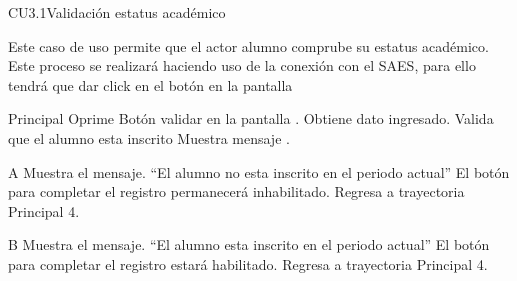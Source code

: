 \begin{UseCase}{CU3.1}{Validación estatus académico}{
		\noindent Este caso de uso permite que el actor alumno comprube su estatus académico. Este proceso se realizará haciendo uso de la conexión con el SAES, para ello tendrá que dar click en el botón  en la pantalla  

	}
		\end{UseCase}
    \begin{UCtrayectoria}{Principal}
    \UCpaso[\UCactor] Oprime Botón validar en la pantalla .
    \UCpaso Obtiene dato ingresado.
	\UCpaso Valida que el alumno esta inscrito 
    \UCpaso Muestra mensaje .  
    \end{UCtrayectoria}
    
	\begin{UCtrayectoriaA}{A}{}
		\UCpaso Muestra el mensaje. “El alumno no esta inscrito en el periodo actual”
		\UCpaso El botón para completar el registro permanecerá inhabilitado.
		\UCpaso Regresa a trayectoria Principal 4.
	\end{UCtrayectoriaA}
	
	\begin{UCtrayectoriaA}{B}{}
		\UCpaso Muestra el mensaje. “El alumno esta inscrito en el periodo actual”
		\UCpaso El botón para completar el registro estará habilitado.
        \UCpaso Regresa a trayectoria Principal 4.
	\end{UCtrayectoriaA}